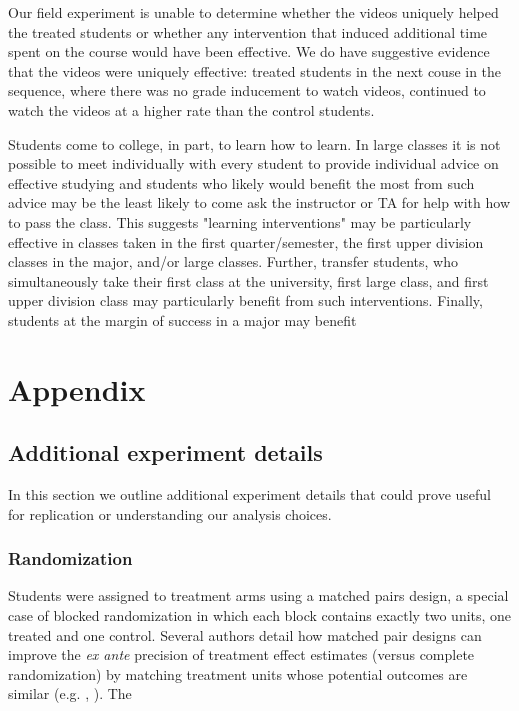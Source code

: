 \documentclass[12pt]{article}
\begin{document}
Our field experiment is unable to determine whether the videos uniquely helped the treated students or whether any intervention that induced additional time spent on the course would have been effective.  We do have suggestive evidence that the videos were uniquely effective:  treated students in the next couse in the sequence, where there was no grade inducement to watch videos, continued to watch the videos at a higher rate than the control students.  

Students come to college, in part, to learn how to learn. In large classes it is not possible to meet individually with every student to provide individual advice on effective studying and students who likely would benefit the most from such advice may be the least likely to come ask the instructor or TA for help with how to pass the class.  This suggests "learning interventions" may be particularly effective in classes taken in the first quarter/semester, the first upper division classes in the major, and/or large classes. Further, transfer students, who simultaneously take their first class at the university, first large class, and first upper division class may particularly benefit from such interventions.  Finally, students at the margin of success in a major may benefit 



\printbibliography


\section*{Appendix}

\renewcommand{\thesubsection}{\Alph{subsection}}

\subsection{Additional experiment details}

In this section we outline additional experiment details that could prove useful for replication or understanding our analysis choices.

\subsubsection{Randomization} \label{a_randomization}
Students were assigned to treatment arms using a matched pairs design, a special case of blocked randomization in which each block contains exactly two units, one treated and one control. Several authors detail how matched pair designs can improve the \textit{ex ante} precision of treatment effect estimates (versus complete randomization) by matching treatment units whose potential outcomes are similar (e.g. \cite{ir2015}, \cite{ai2017}). The 
\end{document}
